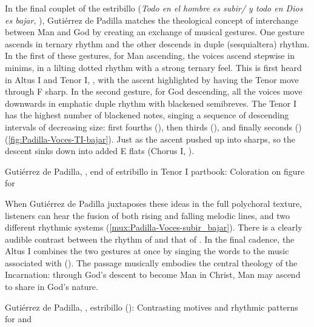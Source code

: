 In the final couplet of the estribillo (\emph{Todo en el hombre es subir/ y todo
en Dios es bajar}, ), Gutiérrez de Padilla matches the
theological concept of interchange between Man and God by creating an exchange
of musical gestures.
One gesture ascends in ternary rhythm and the other descends in duple
(sesquialtera) rhythm.
In the first of these gestures, for Man ascending, the voices ascend stepwise in
minims, in a lilting dotted rhythm with a strong ternary feel.
This is first heard in Altus I and Tenor I, , with the ascent
highlighted by having the Tenor move through F sharp.
In the second gesture, for God descending, all the voices move downwards in
emphatic duple rhythm with blackened semibreves.
The Tenor I has the highest number of blackened notes, singing a sequence of
descending intervals of decreasing size: first fourths (),
then thirds (), and finally seconds ()
(\cref{fig:Padilla-Voces-TI-bajar}).
Just as the ascent pushed up into sharps, so the descent sinks down into added E
flats (Chorus I, ).

{Gutiérrez de Padilla, , end of estribillo in
Tenor I partbook: Coloration on figure for }

When Gutiérrez de Padilla juxtaposes these ideas in the full polychoral texture,
listeners can hear the fusion of both rising and falling melodic lines, and two
different rhythmic systems (\cref{mux:Padilla-Voces-subir_bajar}).
There is a clearly audible contrast between the rhythm of  and that of .
In the final cadence, the Altus I combines the two gestures at once by singing
the words  to the music associated with
 ().
The passage musically embodies the central theology of the Incarnation: through
God's descent to become Man in Christ, Man may ascend to share in God's nature.

{Gutiérrez de Padilla, , estribillo
(): Contrasting motives and rhythmic patterns for  and }

